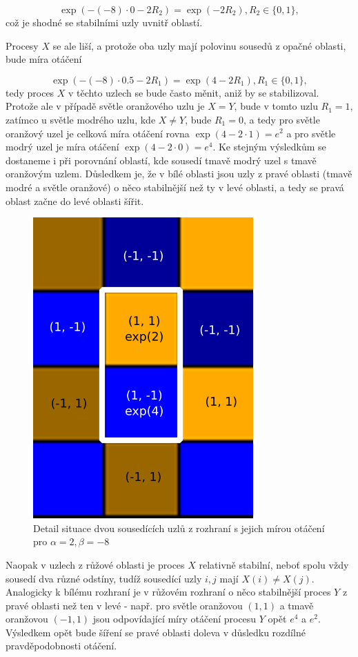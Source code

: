 \documentclass{article}
\begin{document}
\[ \exp(-(-8)\cdot 0-2R_2) = \exp(-2R_2), R_2 \in \{0, 1\}, \]
což je shodné se stabilními uzly uvnitř oblastí.

Procesy $X$ se ale liší, a protože oba uzly mají polovinu sousedů z opačné oblasti, bude míra otáčení 

\[\exp(-(-8) \cdot 0.5 - 2R_1) = \exp(4 - 2R_1), R_1 \in \{0, 1\},\] 
tedy proces $X$ v těchto uzlech se bude často měnit, aniž by se stabilizoval. Protože ale v případě světle oranžového uzlu je $X = Y$, bude v tomto uzlu $R_1 = 1$, zatímco u světle modrého uzlu, kde $X \neq Y$, bude $R_1 = 0$, a tedy pro světle oranžový uzel je celková míra otáčení rovna $\exp(4 - 2 \cdot 1) = e^2$ a pro světle modrý uzel je míra otáčení $\exp(4 - 2 \cdot 0) = e^4$. Ke stejným výsledkům se dostaneme i při porovnání oblastí, kde sousedí tmavě modrý uzel s tmavě oranžovým uzlem. Důsledkem je, že v bílé oblasti jsou uzly z pravé oblasti (tmavě modré a světle oranžové) o něco stabilnější než ty v levé oblasti, a tedy se pravá oblast začne do levé oblasti šířit.


\begin{figure}[H]
 \includegraphics[scale=0.8]{detail_stabilita_vln}
 \caption{Detail situace dvou sousedících uzlů z rozhraní s jejich mírou otáčení pro $\alpha=2, \beta=-8$}
 \label{fig:detail_stabilita_vln}
\end{figure}

Naopak v uzlech z růžové oblasti je proces $X$ relativně stabilní, neboť spolu vždy sousedí dva různé odstíny, tudíž sousedící uzly $i, j$ mají $X(i) \neq X(j)$. Analogicky k bílému rozhraní je v růžovém rozhraní o něco stabilnější proces $Y$ z pravé oblasti než ten v levé - např. pro světle oranžovou $(1,1)$ a tmavě oranžovou $(-1,1)$ jsou odpovídající míry otáčení procesu $Y$ opět $e^4$ a $e^2$. Výsledkem opět bude šíření se pravé oblasti doleva v důsledku rozdílné pravděpodobnosti otáčení.
\end{document}
